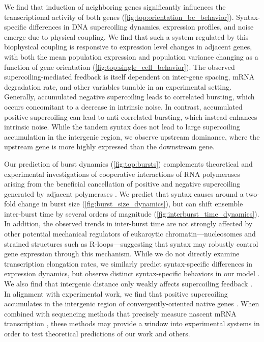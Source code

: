 \documentclass[11pt]{article}
\begin{document}
We find that induction of neighboring genes significantly influences the transcriptional activity of both genes (\cref{fig:top:orientation_bc_behavior}). Syntax-specific differences in DNA supercoiling dynamics, expression profiles, and noise emerge due to physical coupling. We find that such a system regulated by this biophysical coupling is responsive to expression level changes in adjacent genes, with both the mean population expression and population variance changing as a function of gene orientation (\cref{fig:top:single_cell_behavior}). The observed supercoiling-mediated feedback is itself dependent on inter-gene spacing, mRNA degradation rate, and other variables tunable in an experimental setting. Generally, accumulated negative supercoiling leads to correlated bursting, which occurs concomitant to a decrease in intrinsic noise. In contrast, accumulated positive supercoiling can lead to anti-correlated bursting, which instead enhances intrinsic noise. While the tandem syntax does not lead to large supercoiling accumulation in the intergenic region, we observe upstream dominance, where the upstream gene is more highly expressed than the downstream gene.

Our prediction of burst dynamics (\cref{fig:top:bursts}) complements theoretical and experimental investigations of cooperative interactions of RNA polymerases arising from the beneficial cancellation of positive and negative supercoiling generated by adjacent polymerases \parencite{sevierCollectivePolymeraseDynamics2022,kimLongDistanceCooperativeAntagonistic2019}. We predict that syntax causes around a two-fold change in burst size (\cref{fig:burst_size_dynamics}), but can shift ensemble inter-burst time by several orders of magnitude (\cref{fig:interburst_time_dynamics}). In addition, the observed trends in inter-burst time are not strongly affected by other potential mechanical regulators of eukaroytic chromatin---nucleosomes and strained structures such as R-loops---suggesting that syntax may robustly control gene expression through this mechanism.
While we do not directly examine transcription elongation rates, we similarly predict syntax-specific differences in expression dynamics, but observe distinct syntax-specific behaviors in our model \parencite{sevierCollectivePolymeraseDynamics2022,tripathiDNASupercoilingmediatedCollective2021}.  We also find that intergenic distance only weakly affects supercoiling feedback \parencite{tripathiDNASupercoilingmediatedCollective2021}.
 In alignment with experimental work, we find that  positive supercoiling accumulates in the intergenic region of convergently-oriented native genes \parencite{guoHighresolutionGenomewideMapping2021}. When combined with sequencing methods that precisely measure nascent mRNA transcription \parencite{mellorInterleavedGenome2016}, these methods may provide a window into experimental systems in order to test theoretical predictions of our work and others.
\end{document}
